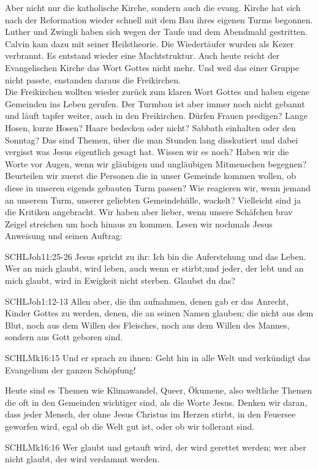 \documentclass[14pt]{../../inc/mybib}
\newenvironment{block}[1][]{%
  \vspace{1.5em}%
  \noindent\textbf{#1}\par%
  \vspace{0.0em}%
}{%
  \vspace{1em}%
}
\begin{document}
\begin{block}
    Aber nicht nur die katholische Kirche, sondern auch die evang. Kirche hat sich nach der Reformation wieder schnell mit dem Bau ihres eigenen Turms begonnen.
    Luther und Zwingli haben sich wegen der Taufe und dem Abendmahl gestritten. Calvin kam dazu mit seiner Heilstheorie. Die Wiedertäufer wurden als Kezer verbrannt. Es entstand wieder eine Machtstruktur. Auch heute reicht der Evangelischen Kirche das Wort Gottes nicht mehr. Und weil das einer Gruppe nicht passte, enstanden daraus die Freikirchen.\\
    Die Freikirchen wollten wieder zurück zum klaren Wort Gottes und haben eigene Gemeinden ins Leben gerufen. Der Turmbau ist aber immer noch nicht gebannt und läuft tapfer weiter, auch in den Freikirchen. Dürfen Frauen predigen? Lange Hosen, kurze Hosen? Haare bedecken oder nicht? Sabbath einhalten oder den Sonntag? Das sind Themen, über die man Stunden lang disskutiert und dabei vergisst was Jesus eigentlich gesagt hat. Wissen wir es noch? Haben wir die Worte vor Augen, wenn wir gläubigen und ungläubigen Mitmenschen begegnen? Beurteilen wir zuerst die Personen die in unser Gemeinde kommen wollen, ob diese in unseren eigends gebauten Turm passen? Wie reagieren wir, wenn jemand an unserem Turm, unserer geliebten Gemeindehülle, wackelt? Vielleicht sind ja die Kritiken angebracht. Wir haben aber lieber, wenn unsere Schäfchen brav Zeigel streichen um hoch hinaus zu kommen.
    Lesen wir nochmals Jesus Anweisung und seinen Auftrag:
    \begin{bibelbox}{SCHL}{Joh}{11:25-26}
        Jesus spricht zu ihr: Ich bin die Auferstehung und das Leben. Wer an mich glaubt, wird leben, auch wenn er stirbt;und jeder, der lebt und an mich glaubt, wird in Ewigkeit nicht sterben. Glaubst du das?
    \end{bibelbox} 
    \begin{bibelbox}{SCHL}{Joh}{1:12-13}
        Allen aber, die ihn aufnahmen, denen gab er das Anrecht, Kinder Gottes zu werden, denen, die an seinen Namen glauben;
        die nicht aus dem Blut, noch aus dem Willen des Fleisches, noch aus dem Willen des Mannes, sondern aus Gott geboren sind.
    \end{bibelbox}     
    \begin{bibelbox}{SCHL}{Mk}{16:15}
        Und er sprach zu ihnen: Geht hin in alle Welt und verkündigt das Evangelium der ganzen Schöpfung!
    \end{bibelbox} 
    Heute sind es Themen wie Klimawandel, Queer, Ökumene, also weltliche Themen die oft in den Gemeinden wichtiger sind, als die Worte Jesus. Denken wir daran, dass jeder Mensch, der ohne Jesus Christus im Herzen stirbt, in den Feuersee geworfen wird, egal ob die Welt gut ist, oder ob wir tollerant sind. 
    \begin{bibelbox}{SCHL}{Mk}{16:16}
        Wer glaubt und getauft wird, der wird gerettet werden; wer aber nicht glaubt, der wird verdammt werden.
    \end{bibelbox} 
\end{block}
\end{document}
